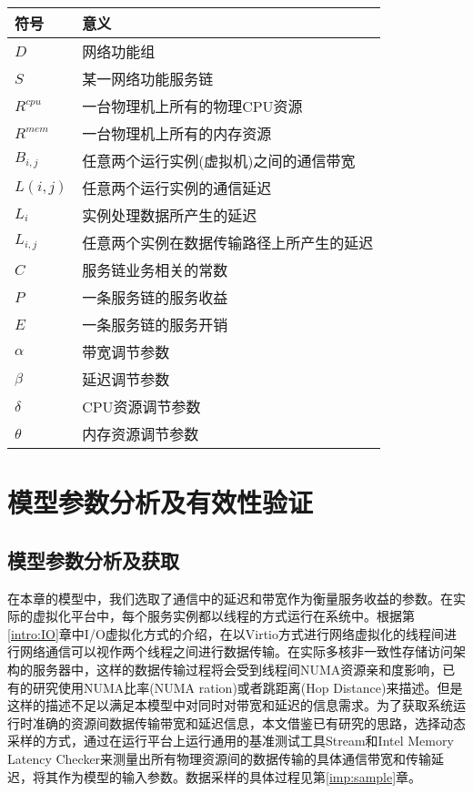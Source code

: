 \begin{table}[htb]
	\centering
	\begin{tabular}{ | l | p{7cm} |}\hline
		\textbf{符号} &							 \textbf{意义}  				\\ 	\hline
		$D$   &	网络功能组  \\ \hline
		$S$	  & 某一网络功能服务链    \\ \hline
	    $R^{cpu}$     & 一台物理机上所有的物理CPU资源   \\ \hline
	    $R^{mem}$     & 一台物理机上所有的内存资源   \\ \hline
	 	$B_{i,j}$	   & 任意两个运行实例(虚拟机)之间的通信带宽   \\ \hline
		$L(i,j)$       & 任意两个运行实例的通信延迟   \\ \hline
		$L_{i}$        &  实例处理数据所产生的延迟  \\ \hline
	    $L_{i,j}$      &  任意两个实例在数据传输路径上所产生的延迟  \\ \hline
	    $C$      &   服务链业务相关的常数\\ \hline
	    $P$      &  一条服务链的服务收益  \\ \hline
	    $E$    &  一条服务链的服务开销  \\ \hline
	    $\alpha$   & 带宽调节参数   \\ \hline
	    $\beta$       & 延迟调节参数   \\ \hline 
	    $\delta$   & CPU资源调节参数   \\ \hline
	    $\theta$      & 内存资源调节参数   \\ \hline   
	\end{tabular}
\end{table}

\newpage
\section{模型参数分析及有效性验证}
\subsection{模型参数分析及获取}
在本章的模型中，我们选取了通信中的延迟和带宽作为衡量服务收益的参数。在实际的虚拟化平台中，每个服务实例都以线程的方式运行在系统中。根据第\ref{intro:IO}章中I/O虚拟化方式的介绍，在以Virtio方式进行网络虚拟化的线程间进行网络通信可以视作两个线程之间进行数据传输。在实际多核非一致性存储访问架构的服务器中，这样的数据传输过程将会受到线程间NUMA资源亲和度影响，已有的研究使用NUMA比率(NUMA ration)或者跳距离(Hop Distance)来描述。但是这样的描述不足以满足本模型中对同时对带宽和延迟的信息需求。为了获取系统运行时准确的资源间数据传输带宽和延迟信息，本文借鉴已有研究的思路，选择动态采样的方式，通过在运行平台上运行通用的基准测试工具Stream和Intel Memory Latency Checker来测量出所有物理资源间的数据传输的具体通信带宽和传输延迟，将其作为模型的输入参数。数据采样的具体过程见第\ref{imp:sample}章。

